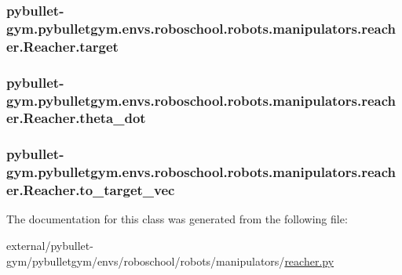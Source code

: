 \subsubsection[{\texorpdfstring{target}{target}}]{\setlength{\rightskip}{0pt plus 5cm}pybullet-\/gym.\+pybulletgym.\+envs.\+roboschool.\+robots.\+manipulators.\+reacher.\+Reacher.\+target}\hypertarget{classpybullet-gym_1_1pybulletgym_1_1envs_1_1roboschool_1_1robots_1_1manipulators_1_1reacher_1_1_reacher_a471d3970a10d80e0622009b147189dc6}{}\label{classpybullet-gym_1_1pybulletgym_1_1envs_1_1roboschool_1_1robots_1_1manipulators_1_1reacher_1_1_reacher_a471d3970a10d80e0622009b147189dc6}
\subsubsection[{\texorpdfstring{theta\+\_\+dot}{theta_dot}}]{\setlength{\rightskip}{0pt plus 5cm}pybullet-\/gym.\+pybulletgym.\+envs.\+roboschool.\+robots.\+manipulators.\+reacher.\+Reacher.\+theta\+\_\+dot}\hypertarget{classpybullet-gym_1_1pybulletgym_1_1envs_1_1roboschool_1_1robots_1_1manipulators_1_1reacher_1_1_reacher_a3a792a2edf20c6d7dbe87f8f87031a89}{}\label{classpybullet-gym_1_1pybulletgym_1_1envs_1_1roboschool_1_1robots_1_1manipulators_1_1reacher_1_1_reacher_a3a792a2edf20c6d7dbe87f8f87031a89}
\subsubsection[{\texorpdfstring{to\+\_\+target\+\_\+vec}{to_target_vec}}]{\setlength{\rightskip}{0pt plus 5cm}pybullet-\/gym.\+pybulletgym.\+envs.\+roboschool.\+robots.\+manipulators.\+reacher.\+Reacher.\+to\+\_\+target\+\_\+vec}\hypertarget{classpybullet-gym_1_1pybulletgym_1_1envs_1_1roboschool_1_1robots_1_1manipulators_1_1reacher_1_1_reacher_a4635484cc1275b080d4559623f651604}{}\label{classpybullet-gym_1_1pybulletgym_1_1envs_1_1roboschool_1_1robots_1_1manipulators_1_1reacher_1_1_reacher_a4635484cc1275b080d4559623f651604}


The documentation for this class was generated from the following file\+:\begin{DoxyCompactItemize}
\item 
external/pybullet-\/gym/pybulletgym/envs/roboschool/robots/manipulators/\hyperlink{roboschool_2robots_2manipulators_2reacher_8py}{reacher.\+py}\end{DoxyCompactItemize}
